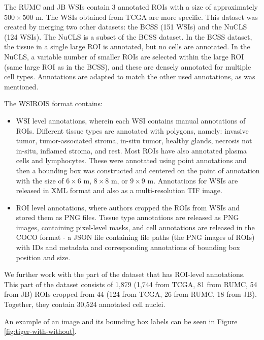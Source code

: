 The RUMC and JB WSIs contain 3 annotated ROIs with a size of approximately $500\!\times\!500$ \textmu m. The WSIs obtained from TCGA are more specific. This dataset was created by merging two other datasets: the BCSS (151 WSIs) and the NuCLS (124 WSIs). The NuCLS is a subset of the BCSS dataset. In the BCSS dataset, the tissue in a single large ROI is annotated, but no cells are annotated. In the NuCLS, a variable number of smaller ROIs are selected within the large ROI (same large ROI as in the BCSS), and these are densely annotated for multiple cell types. Annotations are adapted to match the other used annotations, as was mentioned.

The WSIROIS format contains:

\begin{itemize}
    \item WSI level annotations, wherein each WSI contains manual annotations of ROIs. Different tissue types are annotated with polygons, namely: invasive tumor, tumor-associated stroma, in-situ tumor, healthy glands, necrosis not in-situ, inflamed stroma, and rest. Most ROIs have also annotated plasma cells and lymphocytes. These were annotated using point annotations and then a bounding box was constructed and centered on the point of annotation with the size of $6\!\times\!6$ \textmu m, $8\!\times\!8$ \textmu m, or $9\!\times\!9$ \textmu m. Annotations for WSIs are released in XML format and also as a multi-resolution TIF image.
    \item ROI level annotations, where authors cropped the ROIs from WSIs and stored them as PNG files. Tissue type annotations are released as PNG images, containing pixel-level masks, and cell annotations are released in the COCO format - a JSON file containing file paths (the PNG images of ROIs) with IDs and metadata and corresponding annotations of bounding box position and size.
\end{itemize}

We further work with the part of the dataset that has ROI-level annotations. This part of the dataset consists of 1,879 (1,744 from TCGA, 81 from RUMC, 54 from JB) ROIs cropped from 44 (124 from TCGA, 26 from RUMC, 18 from JB). Together, they contain 30,524 annotated cell nuclei.

An example of an image and its bounding box labels can be seen in Figure \ref{fig:tiger-with-without}.

